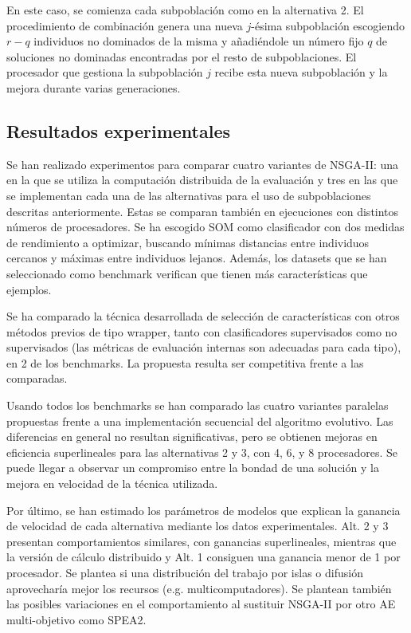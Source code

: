 \documentclass{article}
\begin{document}
En este caso, se comienza cada subpoblación como en la alternativa 2. El procedimiento de combinación genera una nueva $j$-ésima subpoblación escogiendo $r-q$ individuos no dominados de la misma y añadiéndole un número fijo $q$ de soluciones no dominadas encontradas por el resto de subpoblaciones. El procesador que gestiona la subpoblación $j$ recibe esta nueva subpoblación y la mejora durante varias generaciones.

\subsection{Resultados experimentales}
\label{sec-1-5}

Se han realizado experimentos para comparar cuatro variantes de NSGA-II: una en la que se utiliza la computación distribuida de la evaluación y tres en las que se implementan cada una de las alternativas para el uso de subpoblaciones descritas anteriormente. Estas se comparan también en ejecuciones con distintos números de procesadores. Se ha escogido SOM como clasificador con dos medidas de rendimiento a optimizar, buscando mínimas distancias entre individuos cercanos y máximas entre individuos lejanos. Además, los datasets que se han seleccionado como benchmark verifican que tienen más características que ejemplos.

Se ha comparado la técnica desarrollada de selección de características con otros métodos previos de tipo wrapper, tanto con clasificadores supervisados como no supervisados (las métricas de evaluación internas son adecuadas para cada tipo), en 2 de los benchmarks. La propuesta resulta ser competitiva frente a las comparadas.

Usando todos los benchmarks se han comparado las cuatro variantes paralelas propuestas frente a una implementación secuencial del algoritmo evolutivo. Las diferencias en general no resultan significativas, pero se obtienen mejoras en eficiencia superlineales para las alternativas 2 y 3, con 4, 6, y 8 procesadores. Se puede llegar a observar un compromiso entre la bondad de una solución y la mejora en velocidad de la técnica utilizada.

Por último, se han estimado los parámetros de modelos que explican la ganancia de velocidad de cada alternativa mediante los datos experimentales. Alt. 2 y 3 presentan comportamientos similares, con ganancias superlineales, mientras que la versión de cálculo distribuido y Alt. 1 consiguen una ganancia menor de 1 por procesador. Se plantea si una distribución del trabajo por islas o difusión aprovecharía mejor los recursos (e.g. multicomputadores). Se plantean también las posibles variaciones en el comportamiento al sustituir NSGA-II por otro AE multi-objetivo como SPEA2.
\end{document}
